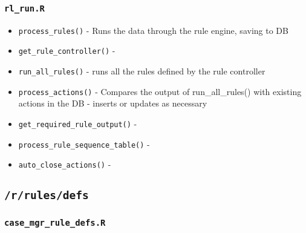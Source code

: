 \documentclass[
]{book}
\providecommand{\tightlist}{%
  \setlength{\itemsep}{0pt}\setlength{\parskip}{0pt}}
\begin{document}
\hypertarget{rl_run.r-1}{%
\subsubsection{\texorpdfstring{\texttt{rl\_run.R}}{rl\_run.R}}\label{rl_run.r-1}}

\begin{itemize}
\tightlist
\item
  \texttt{process\_rules()} - Runs the data through the rule engine, saving to DB
\item
  \texttt{get\_rule\_controller()} -
\item
  \texttt{run\_all\_rules()} - runs all the rules defined by the rule controller
\item
  \texttt{process\_actions()} - Compares the output of run\_all\_rules() with existing actions in the DB - inserts or updates as necessary
\item
  \texttt{get\_required\_rule\_output()} -
\item
  \texttt{process\_rule\_sequence\_table()} -
\item
  \texttt{auto\_close\_actions()} -
\end{itemize}

\hypertarget{rrulesdefs-1}{%
\subsection{\texorpdfstring{\texttt{/r/rules/defs}}{/r/rules/defs}}\label{rrulesdefs-1}}

\hypertarget{case_mgr_rule_defs.r-1}{%
\subsubsection{\texorpdfstring{\texttt{case\_mgr\_rule\_defs.R}}{case\_mgr\_rule\_defs.R}}\label{case_mgr_rule_defs.r-1}}
\end{document}
